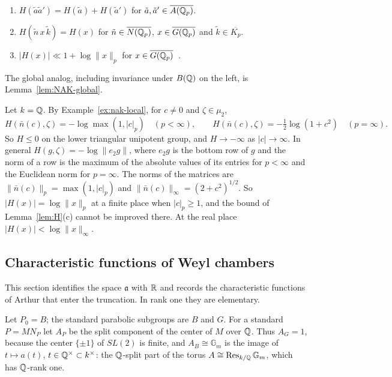 \begin{lemma}\label{lem:H}
\begin{enumerate}[label=(\alph*)]
\item $H(\tilde a\tilde a')=H(\tilde a)+H(\tilde a')$ for
  $\tilde a,\tilde a'\in\overline{A(\mathbb{Q}_p)}$.
\item $H(\tilde n\,x\,\tilde k)=H(x)$ for $\tilde n\in\overline{N(\mathbb{Q}_p)}$,
  $x\in\overline{G(\mathbb{Q}_p)}$ and $\tilde k\in\overline{K_p}$.
\item $|H(x)|\ll1+\log\|x\|_p$ for $x\in\overline{G(\mathbb{Q}_p)}$~\cite{Ar78}.
\end{enumerate}
\end{lemma}

The global analog, including invariance under $B(\mathbb{Q})$ on the left, is
Lemma~\ref{lem:NAK-global}.

\begin{example}\label{ex:height-local}
Let $k=\mathbb{Q}$. By Example~\ref{ex:nak-local}, for $c\ne0$ and
$\zeta\in\mu_2$,
\[
H(\bar n(c),\zeta)=-\log\max(1,|c|_p)\quad(p<\infty),\qquad
H(\bar n(c),\zeta)=-\tfrac12\log(1+c^2)\quad(p=\infty).
\]
So $H\le0$ on the lower triangular unipotent group, and $H\to-\infty$ as
$|c|\to\infty$. In general $H(g,\zeta)=-\log\|e_2g\|$, where $e_2g$ is
the bottom row of $g$ and the norm of a row is the maximum of the
absolute values of its entries for $p<\infty$ and the Euclidean norm for
$p=\infty$. The norms of the matrices are $\|\bar n(c)\|_p=\max(1,|c|_p)$
and $\|\bar n(c)\|_\infty=(2+c^2)^{1/2}$. So $|H(x)|=\log\|x\|_p$ at a
finite place when $|c|_p\ge1$, and the bound of Lemma~\ref{lem:H}(c)
cannot be improved there. At the real place $|H(x)|<\log\|x\|_\infty$.
\end{example}

\subsection{Characteristic functions of Weyl chambers}\label{sec:chambers}

This section identifies the space $\mathfrak a$ with $\mathbb{R}$ and
records the characteristic functions of Arthur that enter the truncation.
In rank one they are elementary.


Let $P_0=B$; the standard parabolic subgroups are $B$ and $G$. For a
standard $P=MN_P$ let $A_P$ be the split component of the center of $M$
over $\mathbb{Q}$. Thus $A_G=1$, because the center $\{\pm1\}$ of $SL(2)$ is
finite, and $A_B\cong\mathbb G_m$ is the image of
$t\mapsto a(t)$, $t\in\mathbb{Q}^\times\subset k^\times$: the $\mathbb{Q}$-split part of
the torus $A\cong\operatorname{Res}_{k/\mathbb{Q}}\mathbb G_m$, which has $\mathbb{Q}$-rank one.


